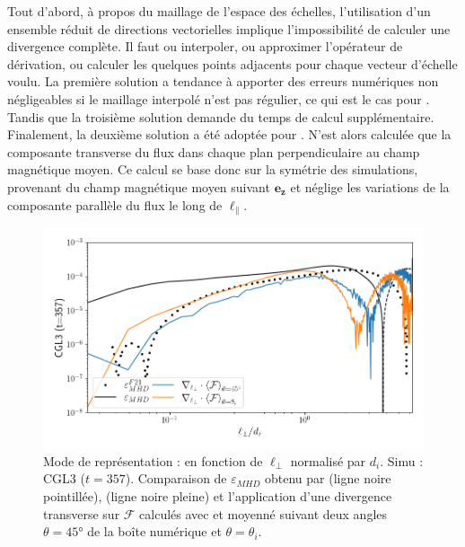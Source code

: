  Tout d'abord, à propos du maillage de l'espace des échelles, l'utilisation d'un ensemble réduit de directions vectorielles implique l'impossibilité de calculer une divergence complète. Il faut ou interpoler, ou approximer l'opérateur de dérivation, ou calculer les quelques points adjacents pour chaque vecteur d'échelle voulu. La première solution a tendance à apporter des erreurs numériques non négligeables si le maillage interpolé n'est pas régulier, ce qui est le cas pour . Tandis que la troisième solution demande du temps de calcul supplémentaire. Finalement, la deuxième solution a été adoptée pour . N'est alors calculée que la composante transverse du flux dans chaque plan perpendiculaire au champ magnétique moyen. Ce calcul se base donc sur la symétrie des simulations, provenant du champ magnétique moyen suivant $\boldsymbol{e_z}$ et néglige les variations de la composante parallèle du flux le long de $\ell_{\parallel}$. 
 \begin{figure}[!ht]
  \centering
 \includegraphics[width=0.9\linewidth,trim=0cm 0cm 0cm 0cm, clip=true]{./Mainmatter/Part_3/images_ch2/CGL3_compa_div}
 \cprotect\caption{Mode de représentation :  en fonction de \ensuremath{\ell_{\perp}} normalisé par \ensuremath{d_i}. Simu : CGL3 (\ensuremath{t =\num{357}}). Comparaison de \ensuremath{\varepsilon_{MHD}} obtenu par  (ligne noire pointillée),  (ligne noire pleine) et l'application d'une divergence transverse sur \ensuremath{\boldsymbol{\mathcal{F}}} calculés avec  et moyenné suivant deux angles \ensuremath{\theta = \ang{45}} de la boîte numérique et \ensuremath{\theta = \theta_i}. }
 \label{fig:compa_div}
 \end{figure} 
 
